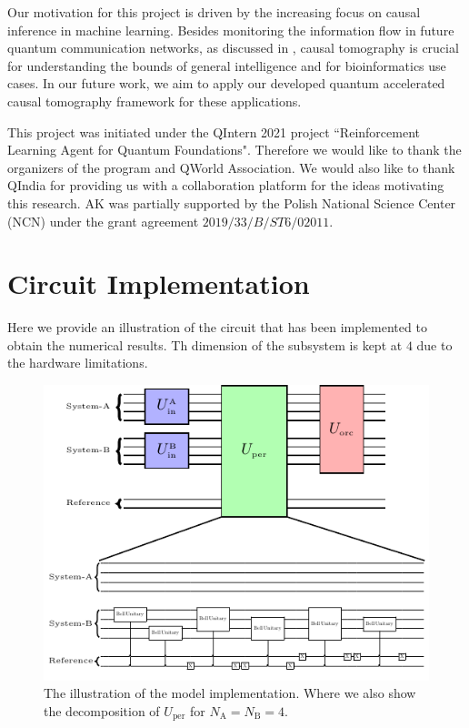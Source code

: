 \documentclass[
 aps,
 jmp,
 amsmath,amssymb,
 reprint,
]{revtex4-2}
\begin{document}
Our motivation for this project is driven by the increasing focus on causal inference in machine learning.
Besides monitoring the information flow in future quantum communication networks, as discussed in \cite{chiribella2019quantum}, causal tomography is crucial for understanding the bounds of general intelligence and for bioinformatics use cases.
In our future work, we aim to apply our developed quantum accelerated causal tomography framework for these applications.

\begin{acknowledgments}
This project was initiated under the QIntern 2021 project ``Reinforcement Learning Agent for Quantum Foundations".
Therefore we would like to thank the organizers of the program and QWorld Association. 
We would also like to thank QIndia for providing us with a collaboration platform for the ideas motivating this research.
AK was partially supported by the Polish National Science Center (NCN) under the grant agreement $2019/33/B/ST6/02011$.
\end{acknowledgments}

\appendix

\section{Circuit Implementation}
Here we provide an illustration of the circuit that has been implemented to obtain the numerical results. Th dimension of the subsystem is kept at $4$ due to the hardware limitations.
\begin{figure}[b!]
	\centering
	\includegraphics[width = 0.7\linewidth]{plot/bortoni.pdf}
	\caption{The illustration of the model implementation. Where we also show the decomposition of $U_\textrm{per}$ for $ N_\textrm{A} = N_\textrm{B} = 4$.}
	\label{fig:perm-circuit}
\end{figure}
\end{document}
